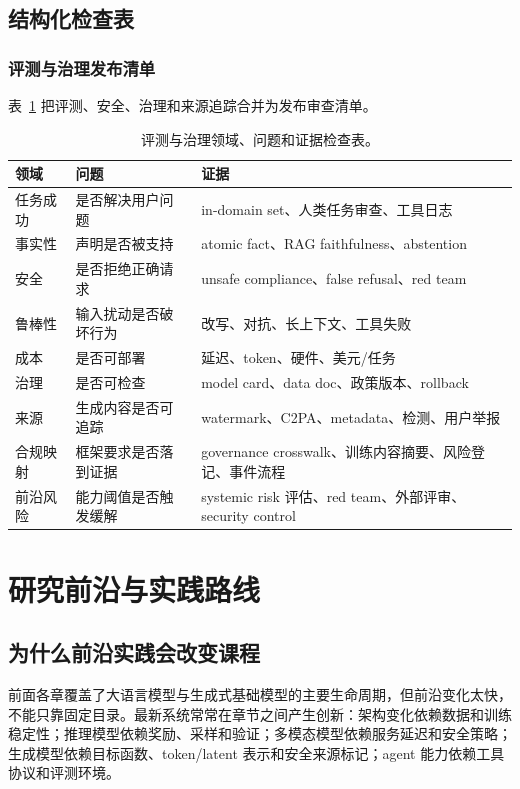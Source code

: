 \documentclass[UTF8,zihao=-4,openany]{ctexbook}
\begin{document}
\section{结构化检查表}
\subsection{评测与治理发布清单}
表~\ref{tab:zh-evaluation-governance-checklist} 把评测、安全、治理和来源追踪合并为发布审查清单。

\begin{table}[t]
\centering
\begin{tabular}{p{}p{}p{}}
\toprule
领域 & 问题 & 证据 \\
\midrule
任务成功 & 是否解决用户问题 & in-domain set、人类任务审查、工具日志 \\
事实性 & 声明是否被支持 & atomic fact、RAG faithfulness、abstention \\
安全 & 是否拒绝正确请求 & unsafe compliance、false refusal、red team \\
鲁棒性 & 输入扰动是否破坏行为 & 改写、对抗、长上下文、工具失败 \\
成本 & 是否可部署 & 延迟、token、硬件、美元/任务 \\
治理 & 是否可检查 & model card、data doc、政策版本、rollback \\
来源 & 生成内容是否可追踪 & watermark、C2PA、metadata、检测、用户举报 \\
合规映射 & 框架要求是否落到证据 & governance crosswalk、训练内容摘要、风险登记、事件流程 \\
前沿风险 & 能力阈值是否触发缓解 & systemic risk 评估、red team、外部评审、security control \\
\bottomrule
\end{tabular}
\caption{评测与治理领域、问题和证据检查表。}
\label{tab:zh-evaluation-governance-checklist}
\end{table}

\chapter{研究前沿与实践路线}
\section{为什么前沿实践会改变课程}
前面各章覆盖了大语言模型与生成式基础模型的主要生命周期，但前沿变化太快，不能只靠固定目录。最新系统常常在章节之间产生创新：架构变化依赖数据和训练稳定性；推理模型依赖奖励、采样和验证；多模态模型依赖服务延迟和安全策略；生成模型依赖目标函数、token/latent 表示和安全来源标记；agent 能力依赖工具协议和评测环境。
\end{document}
